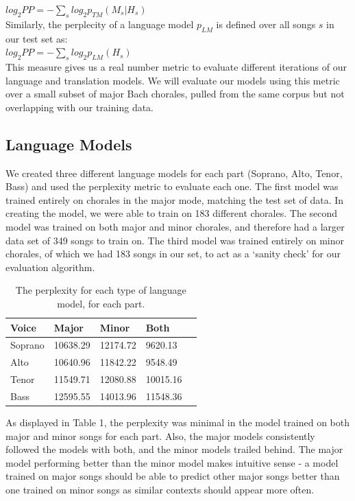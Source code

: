 \documentclass{sig-alternate}
\begin{document}
$log_2 PP = - \sum_{s} log_2 p_{TM}(M_{s}|H_{s})$\\

Similarly, the perplecity of a language model $p_{LM}$ is defined over all songs $s$ in our test set as:\\

$log_2 PP = - \sum_{s} log_2 p_{LM}(H_{s})$\\

This measure gives us a real number metric to evaluate different iterations of our language and translation models. We will evaluate our models using this metric over a small subset of major Bach chorales, pulled from the same corpus but not overlapping with our training data.

\subsection{Language Models}
We created three different language models for each part (Soprano, Alto, Tenor, Bass) and used the perplexity metric to evaluate each one. The first model was trained entirely on chorales in the major mode, matching the test set of data. In creating the model, we were able to train on 183 different chorales. The second model was trained on both major and minor chorales, and therefore had a larger data set of 349 songs to train on. The third model was trained entirely on minor chorales, of which we had 183 songs in our set, to act as a `sanity check' for our evaluation algorithm.
\begin{table}[h]
  \begin{center}
      \begin{tabular}{| l | l | l | l | l |}
      \hline
       Voice & Major & Minor & Both \\ \hline
       Soprano &  10638.29 & 12174.72 & 9620.13  \\ \hline
       Alto &  10640.96 & 11842.22 & 9548.49 \\ \hline
       Tenor & 11549.71 & 12080.88 & 10015.16 \\ \hline
       Bass & 12595.55 & 14013.96 & 11548.36 \\ \hline
      \end{tabular}
  \end{center}
  \caption{The perplexity for each type of language model, for each part.}
\end{table}

As displayed in Table 1, the perplexity was minimal in the model trained on both major and minor songs for each part. Also, the major models consistently followed the models with both, and the minor models trailed behind. The major model performing better than the minor model makes intuitive sense - a model trained on major songs should be able to predict other major songs better than one trained on minor songs as similar contexts should appear more often. 
\end{document}
